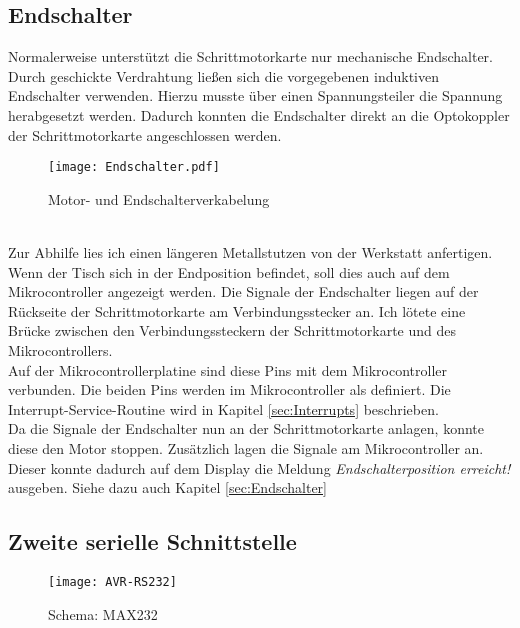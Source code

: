 \subsection{Endschalter}
Normalerweise unterstützt die Schrittmotorkarte nur mechanische Endschalter. Durch geschickte Verdrahtung ließen sich die vorgegebenen induktiven Endschalter verwenden. Hierzu musste über einen Spannungsteiler die Spannung herabgesetzt werden. Dadurch konnten die Endschalter direkt an die Optokoppler der Schrittmotorkarte angeschlossen werden. 
\begin{figure}[h]
\centering
\texttt{[image: Endschalter.pdf]}
\caption{Motor- und Endschalterverkabelung}
\label{fig:Motorverkabelung}
\end{figure}\\
Zur Abhilfe lies ich einen längeren Metallstutzen von der Werkstatt anfertigen.\\
Wenn der Tisch sich in der Endposition befindet, soll dies auch auf dem Mikrocontroller angezeigt werden. Die Signale der Endschalter liegen auf der Rückseite der Schrittmotorkarte  am Verbindungsstecker an. Ich lötete eine Brücke zwischen den Verbindungssteckern der Schrittmotorkarte und des Mikrocontrollers.\\
Auf der Mikrocontrollerplatine sind diese Pins mit dem Mikrocontroller verbunden. Die beiden Pins werden im Mikrocontroller als  definiert. Die Interrupt-Service-Routine wird in Kapitel \ref{sec:Interrupts} beschrieben.\\
Da die Signale der Endschalter nun an der Schrittmotorkarte anlagen, konnte diese den Motor stoppen. Zusätzlich lagen die Signale am Mikrocontroller an. Dieser konnte dadurch auf dem Display die Meldung \emph{Endschalterposition erreicht!} ausgeben. Siehe dazu auch Kapitel \ref{sec:Endschalter}

\subsection{Zweite serielle Schnittstelle}
\begin{figure}[htb]
\centering
\texttt{[image: AVR-RS232]}
\caption{Schema: MAX232}
\label{fig:MAX232}
\citep{uC:RS232}
\end{figure}



